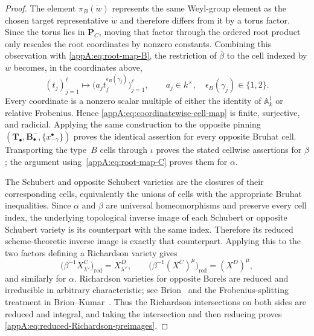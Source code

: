 \documentclass[11pt,a4paper,oneside]{amsart}
\numberwithin{equation}{section}
\theoremstyle{definition}
\theoremstyle{remark}
\begin{document}
\begin{proof}
The element $\pi_B(\dot w)$ represents the same Weyl-group element as the
chosen target representative $\dot w$ and therefore differs from it by a
torus factor.  Since the torus lies in $\mathbf P_C$, moving that factor
through the ordered root product only rescales the root coordinates by
nonzero constants.  Combining this observation with
\eqref{appA:eq:root-map-B}, the restriction of $\overline\beta$ to the cell
indexed by $w$ becomes, in the coordinates above,
\begin{equation}
\label{appA:eq:coordinatewise-cell-map}
 (t_j)_{j=1}^\ell
 \longmapsto
 \bigl(a_jt_j^{\epsilon_B(\gamma_j)}\bigr)_{j=1}^\ell,
 \qquad a_j\in k^\times,
 \quad\epsilon_B(\gamma_j)\in\{1,2\}.
\end{equation}
Every coordinate is a nonzero scalar multiple of either the identity of
$\mathbb A^1_k$ or relative Frobenius.  Hence
\eqref{appA:eq:coordinatewise-cell-map} is finite, surjective, and radicial.
Applying the same construction to the opposite pinning
$(\mathbf T_\bullet,\mathbf B_\bullet^-,
  \{x^\bullet_{-\gamma}\})$
proves the identical assertion for every opposite Bruhat cell.  Transporting
the type~$B$ cells through $\iota$ proves the stated cellwise assertions for
$\beta$; the argument using~\eqref{appA:eq:root-map-C} proves them for
$\alpha$.

The Schubert and opposite Schubert varieties are the closures of their
corresponding cells, equivalently the unions of cells with the appropriate
Bruhat inequalities.  Since $\alpha$ and $\beta$ are universal
homeomorphisms and preserve every cell index, the underlying topological
inverse image of each Schubert or opposite Schubert variety is its
counterpart with the same index.  Therefore its reduced scheme-theoretic
inverse image is exactly that counterpart.  Applying this to the two factors
defining a Richardson variety gives
\[
 \bigl(\beta^{-1}X^C_{\lambda^\vee}\bigr)_{\mathrm{red}}
   =X^D_{\lambda^\vee},
 \qquad
 \bigl(\beta^{-1}(X^C)^\mu\bigr)_{\mathrm{red}}
   =(X^D)^\mu,
\]
and similarly for $\alpha$.  Richardson varieties for opposite Borels are reduced and irreducible in
arbitrary characteristic; see Brion~\cite[Section~1.3]{Brion05} and the
Frobenius-splitting treatment in Brion--Kumar~\cite[Chapter~2]{BrionKumar05}.
Thus the Richardson intersections on both sides are reduced and integral,
and taking the intersection and then reducing proves
\eqref{appA:eq:reduced-Richardson-preimages}.
\end{proof}
\end{document}
